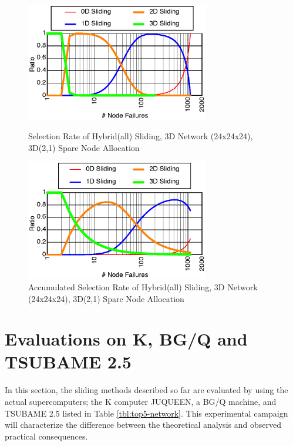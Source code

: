 \documentclass[Afour,times,sagev]{sagej}
\begin{document}
\begin{figure}[ht]
\centering
\includegraphics[width=80mm]{Figs/HYB-24x24x24-Sel-CL.eps}
  \caption{Selection Rate of Hybrid(all) Sliding, 3D Network
    (24x24x24), 3D(2,1) Spare Node Allocation}
\label{fig:sel-rate}
\vspace{5mm}
\includegraphics[width=80mm]{Figs/HYB-24x24x24-SelA-CL.eps}
  \caption{Accumulated Selection Rate of Hybrid(all) Sliding,
    3D Network (24x24x24), 3D(2,1) Spare Node Allocation}
\label{fig:sel-rateA}
\end{figure}

\section{Evaluations on K, BG/Q and TSUBAME 2.5}
\label{sec:eval}

In this section, the sliding methods described so far are evaluated by
using the actual supercomputers; the K computer
JUQUEEN\citep{JUQUEEN}, a BG/Q machine, and TSUBAME 2.5
listed in Table \ref{tbl:top5-network}.
This experimental campaign will characterize the difference
between the theoretical analysis and observed practical consequences.
\end{document}
